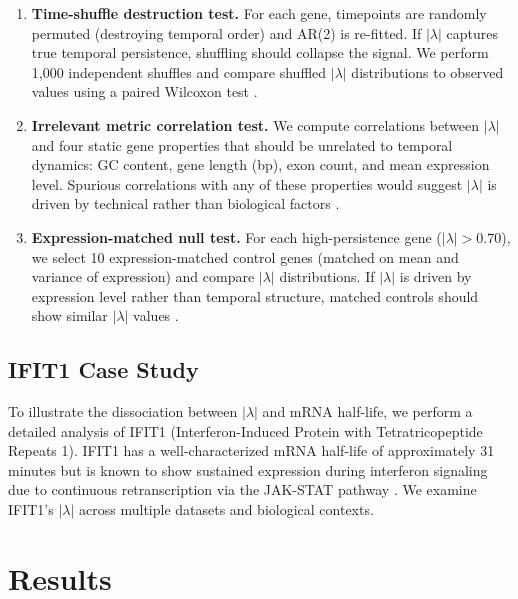 \documentclass[11pt,letterpaper]{article}
\begin{document}
\begin{enumerate}
\item \textbf{Time-shuffle destruction test.} For each gene, timepoints are randomly permuted (destroying temporal order) and AR(2) is re-fitted. If $|\lambda|$ captures true temporal persistence, shuffling should collapse the signal. We perform 1,000 independent shuffles and compare shuffled $|\lambda|$ distributions to observed values using a paired Wilcoxon test \citep{wilcoxon1945individual}.

\item \textbf{Irrelevant metric correlation test.} We compute correlations between $|\lambda|$ and four static gene properties that should be unrelated to temporal dynamics: GC content, gene length (bp), exon count, and mean expression level. Spurious correlations with any of these properties would suggest $|\lambda|$ is driven by technical rather than biological factors \citep{benjamini1995controlling}.

\item \textbf{Expression-matched null test.} For each high-persistence gene ($|\lambda| > 0.70$), we select 10 expression-matched control genes (matched on mean and variance of expression) and compare $|\lambda|$ distributions. If $|\lambda|$ is driven by expression level rather than temporal structure, matched controls should show similar $|\lambda|$ values \citep{fisher1935design}.
\end{enumerate}

\subsection{IFIT1 Case Study}

To illustrate the dissociation between $|\lambda|$ and mRNA half-life, we perform a detailed analysis of IFIT1 (Interferon-Induced Protein with Tetratricopeptide Repeats 1). IFIT1 has a well-characterized mRNA half-life of approximately 31 minutes \citep{sharova2009database, schoggins2011diverse} but is known to show sustained expression during interferon signaling due to continuous retranscription via the JAK-STAT pathway \citep{schoggins2011diverse, schneider2014interferon}. We examine IFIT1's $|\lambda|$ across multiple datasets and biological contexts.

\section{Results}
\end{document}

